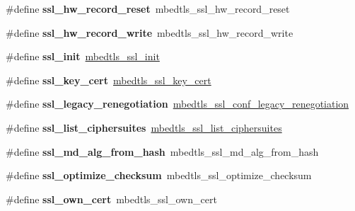 \begin{DoxyCompactItemize}
\item 
\mbox{\label{compat-1_83_8h_adbd6f37970b9a66838601a85838006e0}} 
\#define {\bfseries ssl\+\_\+hw\+\_\+record\+\_\+reset}~mbedtls\+\_\+ssl\+\_\+hw\+\_\+record\+\_\+reset
\item 
\mbox{\label{compat-1_83_8h_ab45b34839f7d123be3bf7cf076a68dc4}} 
\#define {\bfseries ssl\+\_\+hw\+\_\+record\+\_\+write}~mbedtls\+\_\+ssl\+\_\+hw\+\_\+record\+\_\+write
\item 
\mbox{\label{compat-1_83_8h_a1e72f3a491e6e5c45bdbe7a063a38695}} 
\#define {\bfseries ssl\+\_\+init}~\mbox{\hyperlink{ssl_8h_a8560dea66d7830a11874188727ec4c45}{mbedtls\+\_\+ssl\+\_\+init}}
\item 
\mbox{\label{compat-1_83_8h_a678d21a985f97cd767eacf4599df1e81}} 
\#define {\bfseries ssl\+\_\+key\+\_\+cert}~\mbox{\hyperlink{structmbedtls__ssl__key__cert}{mbedtls\+\_\+ssl\+\_\+key\+\_\+cert}}
\item 
\mbox{\label{compat-1_83_8h_a836a9ac27eb7d2be53298c8d44336b8b}} 
\#define {\bfseries ssl\+\_\+legacy\+\_\+renegotiation}~\mbox{\hyperlink{ssl_8h_a193c7bf368780f485e20170c807709e5}{mbedtls\+\_\+ssl\+\_\+conf\+\_\+legacy\+\_\+renegotiation}}
\item 
\mbox{\label{compat-1_83_8h_a8cda05be9346c27bbc0ab1156e0b301a}} 
\#define {\bfseries ssl\+\_\+list\+\_\+ciphersuites}~\mbox{\hyperlink{ssl_8h_aa475d287496d8a93a236a9b91b71dc87}{mbedtls\+\_\+ssl\+\_\+list\+\_\+ciphersuites}}
\item 
\mbox{\label{compat-1_83_8h_a25ea91037dc70b910df9d0637c5fe6b8}} 
\#define {\bfseries ssl\+\_\+md\+\_\+alg\+\_\+from\+\_\+hash}~mbedtls\+\_\+ssl\+\_\+md\+\_\+alg\+\_\+from\+\_\+hash
\item 
\mbox{\label{compat-1_83_8h_a22dfb02639f9509293df3133f293924a}} 
\#define {\bfseries ssl\+\_\+optimize\+\_\+checksum}~mbedtls\+\_\+ssl\+\_\+optimize\+\_\+checksum
\item 
\mbox{\label{compat-1_83_8h_a17fb951f5a9f0fd47af96a5a7dae2153}} 
\#define {\bfseries ssl\+\_\+own\+\_\+cert}~mbedtls\+\_\+ssl\+\_\+own\+\_\+cert

\end{DoxyCompactItemize}
